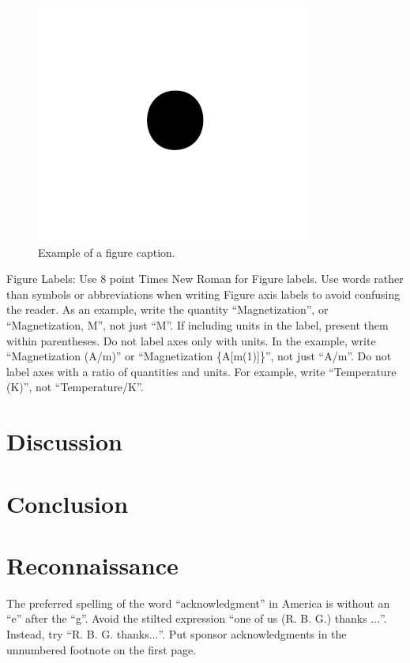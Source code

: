 \documentclass[journal]{IEEEtran}
\begin{document}
\begin{figure}[htbp]
\centerline{\includegraphics{fig1.png}}
\caption{Example of a figure caption.}
\label{fig}
\end{figure}

Figure Labels: Use 8 point Times New Roman for Figure labels. Use words 
rather than symbols or abbreviations when writing Figure axis labels to 
avoid confusing the reader. As an example, write the quantity 
``Magnetization'', or ``Magnetization, M'', not just ``M''. If including 
units in the label, present them within parentheses. Do not label axes only 
with units. In the example, write ``Magnetization (A/m)'' or ``Magnetization 
\{A[m(1)]\}'', not just ``A/m''. Do not label axes with a ratio of 
quantities and units. For example, write ``Temperature (K)'', not 
``Temperature/K''.

\section{Discussion}

\section{Conclusion}

\section*{Reconnaissance}

The preferred spelling of the word ``acknowledgment'' in America is without 
an ``e'' after the ``g''. Avoid the stilted expression ``one of us (R. B. 
G.) thanks $\ldots$''. Instead, try ``R. B. G. thanks$\ldots$''. Put sponsor 
acknowledgments in the unnumbered footnote on the first page.
\end{document}
